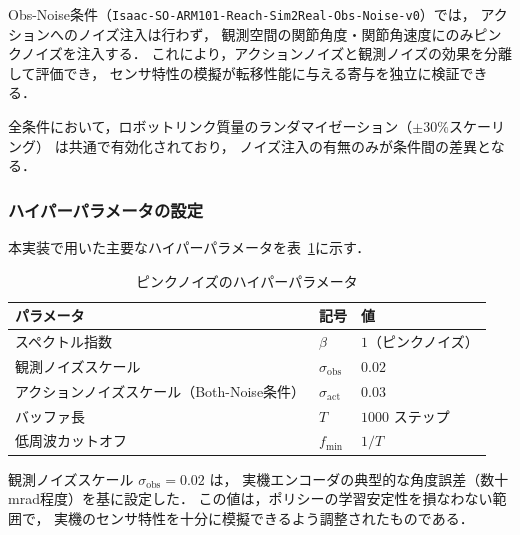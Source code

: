 Obs-Noise条件（\texttt{Isaac-SO-ARM101-Reach-Sim2Real-Obs-Noise-v0}）では，
アクションへのノイズ注入は行わず，
観測空間の関節角度・関節角速度にのみピンクノイズを注入する．
これにより，アクションノイズと観測ノイズの効果を分離して評価でき，
センサ特性の模擬が転移性能に与える寄与を独立に検証できる．

全条件において，ロボットリンク質量のランダマイゼーション（$\pm 30\%$スケーリング）
は共通で有効化されており，
ノイズ注入の有無のみが条件間の差異となる．

\subsubsection{ハイパーパラメータの設定}

本実装で用いた主要なハイパーパラメータを表~\ref{tab:hyperparams}に示す．

\begin{table}[htbp]
  \centering
  \caption{ピンクノイズのハイパーパラメータ}
  \label{tab:hyperparams}
  \begin{tabular}{lll}
    \toprule
    パラメータ & 記号 & 値 \\
    \midrule
    スペクトル指数 & $\beta$ & $1$（ピンクノイズ） \\
    観測ノイズスケール & $\sigma_{\mathrm{obs}}$ & $0.02$ \\
    アクションノイズスケール（Both-Noise条件） & $\sigma_{\mathrm{act}}$ & $0.03$ \\
    バッファ長 & $T$ & $1000$ ステップ \\
    低周波カットオフ & $f_{\min}$ & $1/T$ \\
    \bottomrule
  \end{tabular}
\end{table}

観測ノイズスケール $\sigma_{\mathrm{obs}} = 0.02$ は，
実機エンコーダの典型的な角度誤差（数十mrad程度）を基に設定した．
この値は，ポリシーの学習安定性を損なわない範囲で，
実機のセンサ特性を十分に模擬できるよう調整されたものである．


